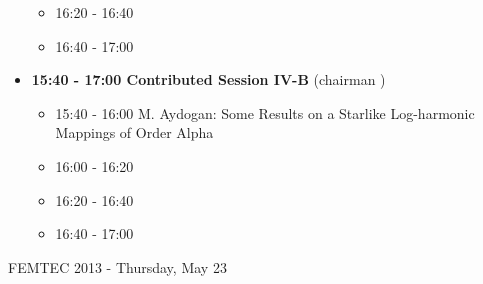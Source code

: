 \documentclass[10pt, A4]{article}%
\begin{document}
\begin{itemize}
\begin{itemize}
    \item 16:20 - 16:40 
    \item 16:40 - 17:00
  \end{itemize}
  \item {\bf 15:40 - 17:00 Contributed Session IV-B} (chairman ) 
  \begin{itemize}
    \item 15:40 - 16:00 {M. Aydogan}: {Some  Results on a Starlike  Log-harmonic Mappings of Order Alpha}
    \item 16:00 - 16:20 
    \item 16:20 - 16:40 
    \item 16:40 - 17:00
  \end{itemize}  
\end{itemize}

\newpage
\newpage

\centerline{\huge FEMTEC 2013 - Thursday, May 23}
\vspace{4mm}
\end{document}
